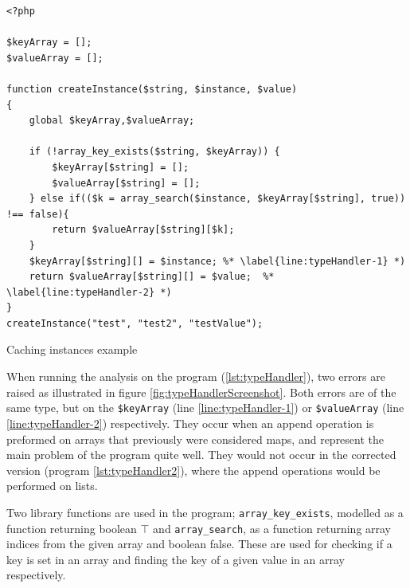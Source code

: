 \begin{program}
\begin{lstlisting}
<?php

$keyArray = [];
$valueArray = [];

function createInstance($string, $instance, $value)
{
    global $keyArray,$valueArray;

    if (!array_key_exists($string, $keyArray)) {
        $keyArray[$string] = [];
        $valueArray[$string] = [];
    } else if(($k = array_search($instance, $keyArray[$string], true)) !== false){
        return $valueArray[$string][$k];
    }
    $keyArray[$string][] = $instance; %* \label{line:typeHandler-1} *)
    return $valueArray[$string][] = $value;  %* \label{line:typeHandler-2} *)
}
createInstance("test", "test2", "testValue");
\end{lstlisting}
\caption{Caching instances example}
\label{lst:typeHandler2}
\end{program}

When running the analysis on the program (\ref{lst:typeHandler}), two errors are raised as illustrated in figure \ref{fig:typeHandlerScreenshot}. Both errors are of the same type, but on the \texttt{\$keyArray} (line \ref{line:typeHandler-1}) or \texttt{\$valueArray} (line \ref{line:typeHandler-2}) respectively. They occur when an append operation is preformed on arrays that previously were considered maps, and represent the main problem of the program quite well. They would not occur in the corrected version (program \ref{lst:typeHandler2}), where the append operations would be performed on lists.

Two library functions are used in the program; \texttt{array\_key\_exists}, modelled as a function returning boolean $\top$ and \texttt{array\_search}, as a function returning array indices from the given array and boolean false. These are used for checking if a key is set in an array and finding the key of a given value in an array respectively.

